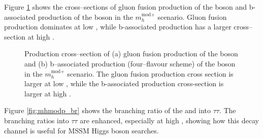 Figure \ref{fig:mhmodp_xs} shows the cross--sections of
gluon fusion production of the \PHiggs boson and b-associated
production of the \PHiggsps boson in the $m_h^{\text{mod+}}$ scenario. Gluon fusion 
production dominates at low \tanb, while b-associated production has a larger cross--section
at high \tanb.

\begin{figure}[h!]
\begin{center}
\end{center}
\caption{Production cross--section of (a) gluon fusion production of the \PHiggs boson and
(b) b--associated production (four--flavour scheme) of the \PHiggsps boson in the $m_{h}^{\text{mod+}}$ scenario. The gluon fusion production cross section is larger at low \tanb, while
the b-associated production cross-section is larger at high \tanb.}
\label{fig:mhmodp_xs}
\end{figure}

Figure \ref{fig:mhmodp_br} shows the branching ratio of the \PHiggs and \PHiggsps 
into $\tau\tau$. The branching ratios into $\tau\tau$ are enhanced, especially at
high \tanb, showing how this decay channel is useful for MSSM Higgs boson searches.

